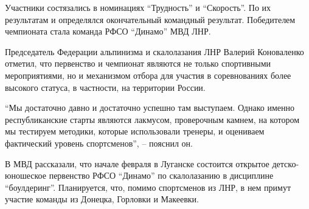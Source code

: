 
Участники состязались в номинациях \enquote{Трудность} и \enquote{Скорость}. По их результатам
и определялся окончательный командный результат. Победителем чемпионата стала
команда РФСО \enquote{Динамо} МВД ЛНР.


Председатель Федерации альпинизма и скалолазания ЛНР Валерий Коноваленко
отметил, что первенство и чемпионат являются не только спортивными
мероприятиями, но и механизмом отбора для участия в соревнованиях более
высокого статуса, в частности, на территории России.


\enquote{Мы достаточно давно и достаточно успешно там выступаем. Однако именно
республиканские старты являются лакмусом, проверочным камнем, на котором мы
тестируем методики, которые использовали тренеры, и оцениваем фактический
уровень спортсменов}, – пояснил он.

В МВД рассказали, что начале февраля в Луганске состоится открытое
детско-юношеское первенство РФСО \enquote{Динамо} по скалолазанию в дисциплине
\enquote{боулдеринг}. Планируется, что, помимо спортсменов из ЛНР, в нем примут участие
команды из Донецка, Горловки и Макеевки.
